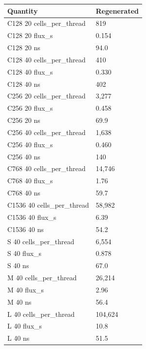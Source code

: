 \begin{tabular}{ll}
Quantity & Regenerated \\
\hline
C128 20 cells\_per\_thread & 819 \\
C128 20 flux\_s & 0.154 \\
C128 20 ns & 94.0 \\
C128 40 cells\_per\_thread & 410 \\
C128 40 flux\_s & 0.330 \\
C128 40 ns & 402 \\
C256 20 cells\_per\_thread & 3,277 \\
C256 20 flux\_s & 0.458 \\
C256 20 ns & 69.9 \\
C256 40 cells\_per\_thread & 1,638 \\
C256 40 flux\_s & 0.460 \\
C256 40 ns & 140 \\
C768 40 cells\_per\_thread & 14,746 \\
C768 40 flux\_s & 1.76 \\
C768 40 ns & 59.7 \\
C1536 40 cells\_per\_thread & 58,982 \\
C1536 40 flux\_s & 6.39 \\
C1536 40 ns & 54.2 \\
S 40 cells\_per\_thread & 6,554 \\
S 40 flux\_s & 0.878 \\
S 40 ns & 67.0 \\
M 40 cells\_per\_thread & 26,214 \\
M 40 flux\_s & 2.96 \\
M 40 ns & 56.4 \\
L 40 cells\_per\_thread & 104,624 \\
L 40 flux\_s & 10.8 \\
L 40 ns & 51.5 \\
\end{tabular}
